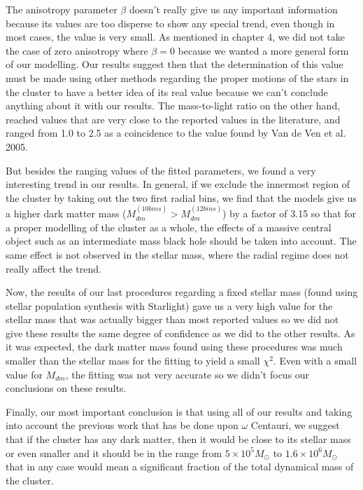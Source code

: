 The anisotropy parameter $\beta$ doesn't really give us any important information because its values are too disperse to show any special trend, even though in most cases, the value is very small. As mentioned in chapter 4, we did not take the case of zero anisotropy where $\beta = 0$ because we wanted a more general form of our modelling. Our results suggest then that the determination of this value must be made using other methods regarding the proper motions of the stars in the cluster to have a better idea of its real value because we can't conclude anything about it with our results. The mass-to-light ratio on the other hand, reached values that are very close to the reported values in the literature, and ranged from 1.0 to 2.5 as a coincidence to the value found by Van de Ven et al. 2005.

But besides the ranging values of the fitted parameters, we found a very interesting trend in our results. In general, if we exclude the innermost region of the cluster by taking out the two first radial bins, we find that the models give us a higher dark matter mass ($M_{dm}^{(10 bins)}>M_{dm}^{(12 bins)}$) by a factor of 3.15 so that for a proper modelling of the cluster as a whole, the effects of a massive central object such as an intermediate mass black hole should be taken into account. The same effect is not observed in the stellar mass, where the radial regime does not really affect the trend.

Now, the results of our last procedures regarding a fixed stellar mass (found using stellar population synthesis with Starlight) gave us a very high value for the stellar mass that was actually bigger than most reported values so we did not give these results the same degree of confidence as we did to the other results. As it was expected, the dark matter mass found using these procedures was much smaller than the stellar mass for the fitting to yield a small $\chi^{2}$. Even with a small value for $M_{dm}$, the fitting was not very accurate so we didn't focus our conclusions on these results.

Finally, our most important conclusion is that using all of our results and taking into account the previous work that has be done upon $\omega$ Centauri, we suggest that if the cluster has any dark matter, then it would be close to its stellar mass or even smaller and it should be in the range from $5 \times 10^{5} M_{\odot}$ to $1.6 \times 10^{6} M_{\odot}$ that in any case would mean a significant fraction of the total dynamical mass of the cluster. 

